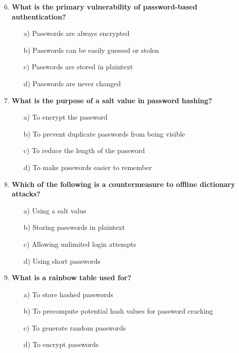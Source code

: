 \documentclass{article}
\begin{document}
\begin{enumerate}
    \setcounter{enumi}{5}
    \item \textbf{What is the primary vulnerability of password-based authentication?}
    \begin{itemize}
        \item[a)] Passwords are always encrypted  
        \item[b)] Passwords can be easily guessed or stolen  
        \item[c)] Passwords are stored in plaintext  
        \item[d)] Passwords are never changed  
    \end{itemize}

    \item \textbf{What is the purpose of a salt value in password hashing?}
    \begin{itemize}
        \item[a)] To encrypt the password  
        \item[b)] To prevent duplicate passwords from being visible  
        \item[c)] To reduce the length of the password  
        \item[d)] To make passwords easier to remember  
    \end{itemize}

    \item \textbf{Which of the following is a countermeasure to offline dictionary attacks?}
    \begin{itemize}
        \item[a)] Using a salt value  
        \item[b)] Storing passwords in plaintext  
        \item[c)] Allowing unlimited login attempts  
        \item[d)] Using short passwords  
    \end{itemize}

    \item \textbf{What is a rainbow table used for?}
    \begin{itemize}
        \item[a)] To store hashed passwords  
        \item[b)] To precompute potential hash values for password cracking  
        \item[c)] To generate random passwords  
        \item[d)] To encrypt passwords  
    \end{itemize}


\end{enumerate}
\end{document}
